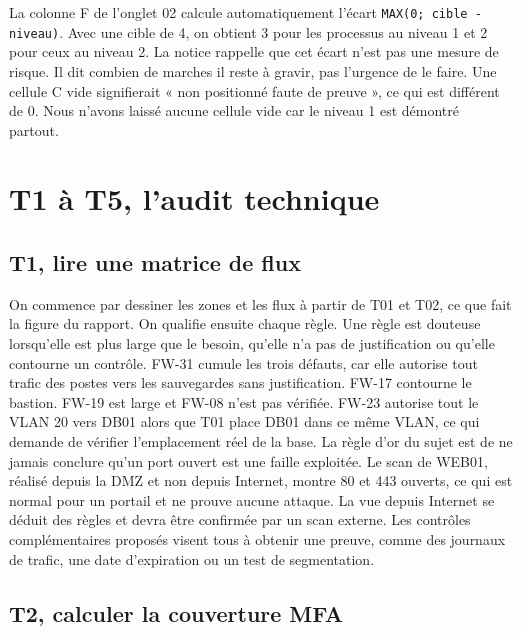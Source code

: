 \documentclass[11pt,a4paper]{article}
\begin{document}
La colonne F de l'onglet 02 calcule automatiquement l'écart \texttt{MAX(0; cible - niveau)}. Avec une cible de 4, on obtient 3 pour les processus au niveau 1 et 2 pour ceux au niveau 2. La notice rappelle que cet écart n'est pas une mesure de risque. Il dit combien de marches il reste à gravir, pas l'urgence de le faire. Une cellule C vide signifierait « non positionné faute de preuve », ce qui est différent de 0. Nous n'avons laissé aucune cellule vide car le niveau 1 est démontré partout.

\section{T1 à T5, l'audit technique}

\subsection{T1, lire une matrice de flux}

On commence par dessiner les zones et les flux à partir de T01 et T02, ce que fait la figure du rapport. On qualifie ensuite chaque règle. Une règle est douteuse lorsqu'elle est plus large que le besoin, qu'elle n'a pas de justification ou qu'elle contourne un contrôle. FW-31 cumule les trois défauts, car elle autorise tout trafic des postes vers les sauvegardes sans justification. FW-17 contourne le bastion. FW-19 est large et FW-08 n'est pas vérifiée. FW-23 autorise tout le VLAN 20 vers DB01 alors que T01 place DB01 dans ce même VLAN, ce qui demande de vérifier l'emplacement réel de la base. La règle d'or du sujet est de ne jamais conclure qu'un port ouvert est une faille exploitée. Le scan de WEB01, réalisé depuis la DMZ et non depuis Internet, montre 80 et 443 ouverts, ce qui est normal pour un portail et ne prouve aucune attaque. La vue depuis Internet se déduit des règles et devra être confirmée par un scan externe. Les contrôles complémentaires proposés visent tous à obtenir une preuve, comme des journaux de trafic, une date d'expiration ou un test de segmentation.

\subsection{T2, calculer la couverture MFA}
\end{document}
